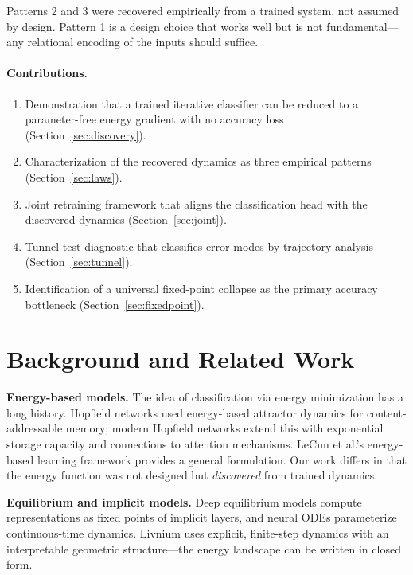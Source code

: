 \documentclass[11pt]{article}
\begin{document}
Patterns 2 and 3 were recovered empirically from a trained system, not
assumed by design. Pattern 1 is a design choice that works well but is
not fundamental---any relational encoding of the inputs should suffice.

\paragraph{Contributions.}
\begin{enumerate}
    \item Demonstration that a trained iterative classifier can be reduced
          to a parameter-free energy gradient with no accuracy loss
          (Section~\ref{sec:discovery}).
    \item Characterization of the recovered dynamics as three empirical
          patterns (Section~\ref{sec:laws}).
    \item Joint retraining framework that aligns the classification head
          with the discovered dynamics (Section~\ref{sec:joint}).
    \item Tunnel test diagnostic that classifies error modes by
          trajectory analysis (Section~\ref{sec:tunnel}).
    \item Identification of a universal fixed-point collapse as the
          primary accuracy bottleneck (Section~\ref{sec:fixedpoint}).
\end{enumerate}

\section{Background and Related Work}
\label{sec:related}

\textbf{Energy-based models.}
The idea of classification via energy minimization has a long history.
Hopfield networks \citep{hopfield1982} used energy-based attractor
dynamics for content-addressable memory; modern Hopfield networks
\citep{ramsauer2020hopfield} extend this with exponential storage
capacity and connections to attention mechanisms. LeCun et al.'s
energy-based learning framework \citep{lecun2006tutorial} provides a
general formulation. Our work differs in that the energy function was
not designed but \emph{discovered} from trained dynamics.

\textbf{Equilibrium and implicit models.}
Deep equilibrium models \citep{bai2019deep} compute representations as
fixed points of implicit layers, and neural ODEs \citep{chen2018neural}
parameterize continuous-time dynamics. Livnium uses explicit, finite-step
dynamics with an interpretable geometric structure---the energy landscape
can be written in closed form.
\end{document}
